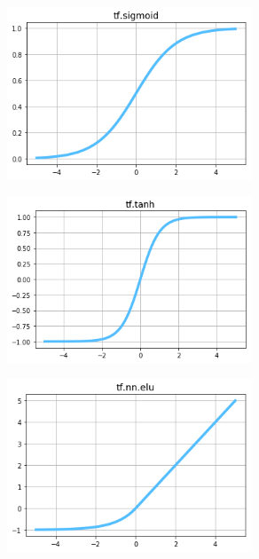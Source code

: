 \begin{figure}
\centering
\includegraphics[width=0.65\textwidth]{./sync_imgs/act/smooth/sigmoid.png}
\label{fig:act_smooth_sigmoid}
\end{figure}

\begin{figure}
\centering
\includegraphics[width=0.65\textwidth]{./sync_imgs/act/smooth/tangent.png}
\label{fig:act_smooth_tangent}
\end{figure}

\begin{figure}
\centering
\includegraphics[width=0.65\textwidth]{./sync_imgs/act/smooth/elu.png}
\label{fig:act_smooth_elu}
\end{figure}

